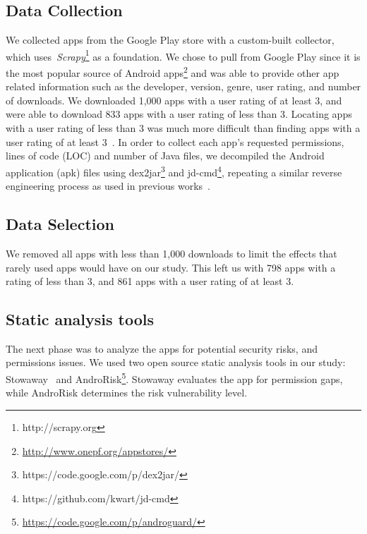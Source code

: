 \documentclass{sig-alternate}
\newcommand{\todo}[1]{\textcolor{cyan}{\textbf{[#1]}}}
\begin{document}
\subsection{Data Collection}

We collected apps from the Google Play store with a custom-built collector, which uses~\emph{Scrapy}\footnote{http://scrapy.org} as a foundation. We chose to pull from Google Play since it is the most popular source of Android apps\footnote{\url{http://www.onepf.org/appstores/}} and was able to provide other app related information such as the developer, version, genre, user rating, and number of downloads. We downloaded 1,000 apps with a user rating of at least 3, and were able to download 833 apps with a user rating of less than 3. Locating apps with a user rating of less than 3 was much more difficult than finding apps with a user rating of at least 3~\cite{mojica2013large}. In order to collect each app's requested permissions, lines of code (LOC) and number of Java files, we decompiled the Android application (apk) files using dex2jar\footnote{ https://code.google.com/p/dex2jar/} and jd-cmd\footnote{https://github.com/kwart/jd-cmd}, repeating a similar reverse engineering process as used in previous works~\cite{apvrille2012android,chawla2014transfiguring, krutz2015dataset}.

\subsection{Data Selection}
We removed all apps with less than 1,000 downloads to limit the effects that rarely used apps would have on our study. This left us with 798 apps with a rating of less than 3, and 861 apps with a user rating of at least 3.

\subsection{Static analysis tools}
\label{sec: analysis}

The next phase was to analyze the apps for potential security risks, and permissions issues. We used two open source static analysis tools in our study: Stowaway~\cite{Felt:2011:APD:2046707.2046779} and AndroRisk\footnote{\url{https://code.google.com/p/androguard/}}. Stowaway evaluates the app for permission gaps, while AndroRisk determines the risk vulnerability level. %
\end{document}
